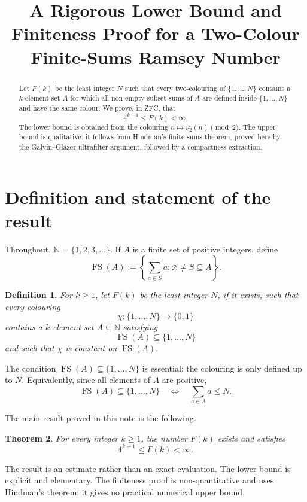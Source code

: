 \documentclass[11pt]{article}
\title{A Rigorous Lower Bound and Finiteness Proof for a Two-Colour Finite-Sums Ramsey Number}
\author{}
\date{}
\newtheorem{theorem}{Theorem}[section]
\newtheorem{definition}[theorem]{Definition}
\newcommand{\NN}{\mathbb N}
\newcommand{\FS}{\operatorname{FS}}
\begin{document}
\maketitle

\begin{abstract}
Let $F(k)$ be the least integer $N$ such that every two-colouring of $\{1,\ldots,N\}$ contains a $k$-element set $A$ for which all non-empty subset sums of $A$ are defined inside $\{1,\ldots,N\}$ and have the same colour. We prove, in ZFC, that
\[
        4^{k-1}\leq F(k)<\infty .
\]
The lower bound is obtained from the colouring $n\mapsto \nu_2(n)\pmod 2$. The upper bound is qualitative: it follows from Hindman's finite-sums theorem, proved here by the Galvin--Glazer ultrafilter argument, followed by a compactness extraction.
\end{abstract}

\section{Definition and statement of the result}

Throughout, $\NN=\{1,2,3,\ldots\}$. If $A$ is a finite set of positive integers, define
\[
    \FS(A):=\left\{\sum_{a\in S}a:\varnothing\neq S\subseteq A\right\}.
\]

\begin{definition}
For $k\geq 1$, let $F(k)$ be the least integer $N$, if it exists, such that every colouring
\[
    \chi:\{1,\ldots,N\}\to \{0,1\}
\]
contains a $k$-element set $A\subseteq \NN$ satisfying
\[
    \FS(A)\subseteq \{1,\ldots,N\}
\]
and such that $\chi$ is constant on $\FS(A)$.
\end{definition}

The condition $\FS(A)\subseteq\{1,\ldots,N\}$ is essential: the colouring is only defined up to $N$. Equivalently, since all elements of $A$ are positive,
\[
    \FS(A)\subseteq\{1,\ldots,N\}
    \quad\Longleftrightarrow\quad
    \sum_{a\in A}a\leq N.
\]

The main result proved in this note is the following.

\begin{theorem}\label{thm:main}
For every integer $k\geq 1$, the number $F(k)$ exists and satisfies
\[
    4^{k-1}\leq F(k)<\infty .
\]
\end{theorem}

The result is an estimate rather than an exact evaluation. The lower bound is explicit and elementary. The finiteness proof is non-quantitative and uses Hindman's theorem; it gives no practical numerical upper bound.
\end{document}
